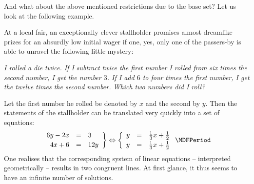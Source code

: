 \begin{MIntro}
And what about the above mentioned restrictions due to the base set? 
Let us look at the following example.

\begin{MExample}
At a local fair, an exceptionally clever stallholder promises almost dreamlike prizes for an absurdly low initial wager if one, yes, only one of the passers-by is able to unravel the 
following little mystery:

\textit{I rolled a die twice. If I subtract twice the first number I rolled from six times
the second number, I get the number $3$. If I add $6$ to four times the first number, I get the twelve times the second number. Which two numbers did I roll?}

Let the first number he rolled be denoted by $x$ and the second by $y$. 
Then the statements of the stallholder can be translated very quickly into a set of equations:
$$\left. \begin{array}{rcl} 6 y - 2 x & = & 3 \\[.5ex] 4 x + 6 & = & 12 y \end{array} \right\} \Leftrightarrow
\left\{ \begin{array}{rcl} y & = & \Mtfrac13 x + \Mtfrac12 \\[.5ex]
y & = & \Mtfrac13 x + \Mtfrac12 \end{array} \right. \MDFPeriod $$
One realises that the corresponding system of linear equations -- interpreted geometrically -- 
results in two congruent lines. At first glance, it thus seems to have an infinite number
of solutions.


\end{MExample}
\end{MIntro}
